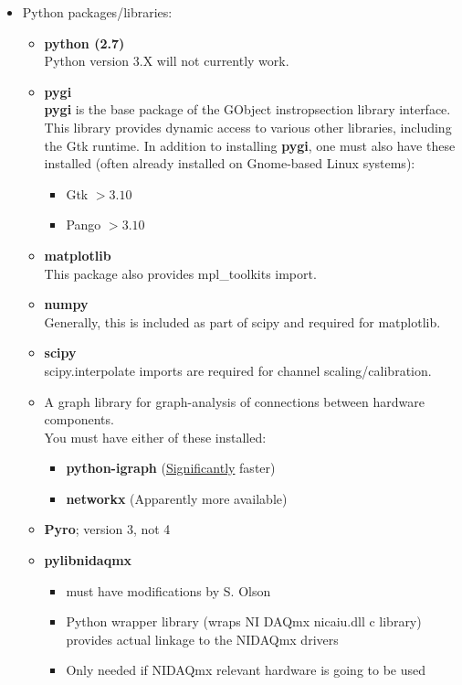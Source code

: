 \begin{itemize}
  \item Python packages/libraries:
    \begin{itemize}
      \item \textbf{python (2.7)} \\
        Python version 3.X will not currently work.
      \item \textbf{pygi} \\
        \textbf{pygi} is the base package of the GObject instropsection library
        interface.  This library provides dynamic access to various other
        libraries, including the Gtk runtime.  In addition to installing
        \textbf{pygi}, one must also have these installed (often already installed
        on Gnome-based Linux systems):
        \begin{itemize}
          \item Gtk $> 3.10$
          \item Pango $> 3.10$
        \end{itemize}

      \item \textbf{matplotlib} \\
        This package also provides mpl\_toolkits import.
      \item \textbf{numpy} \\
        Generally, this is included as part of scipy and required for matplotlib.
      \item \textbf{scipy} \\
        scipy.interpolate imports are required for channel scaling/calibration.
      \item A graph library for graph-analysis of connections between hardware
        components.\\
        You must have either of these installed:
        \begin{itemize}
          \item \textbf{python-igraph} (\underline{Significantly} faster)
          \item \textbf{networkx} (Apparently more available)
        \end{itemize}

      \item \textbf{Pyro}; version 3, not 4

      \item \textbf{pylibnidaqmx}
        \begin{itemize}
          \item must have modifications by S. Olson
          \item Python wrapper library (wraps NI DAQmx nicaiu.dll c library)
            provides actual linkage to the NIDAQmx drivers
          \item Only needed if NIDAQmx relevant hardware is going to be used
        \end{itemize}


\end{itemize}
\end{itemize}

